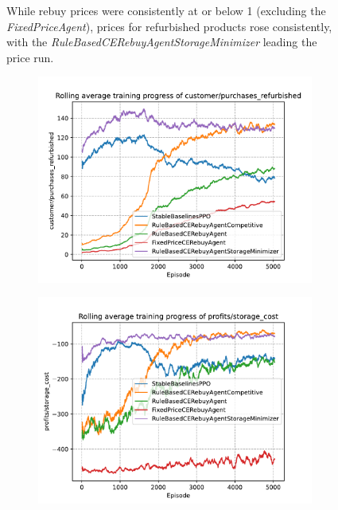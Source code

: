 \begin{figure}[ht]
\begin{subfigure}[t]{0.49\textwidth}
		\label{fig:PPOOligopolyLinePriceRefurbished}
	\end{subfigure}
	\caption{While rebuy prices were consistently at or below 1 (excluding the \emph{FixedPriceAgent}), prices for refurbished products rose consistently, with the \emph{RuleBasedCERebuyAgentStorageMinimizer} leading the price run.}\label{fig:PPOOligopolyDiagramsPrices}
\end{figure}


\begin{figure}[ht]
	\centering
	\begin{subfigure}[t]{0.49\textwidth}
		\centering
		\includegraphics[width = \textwidth]{images/experiments/PPOOligopoly/PPOOligopolyLinePurchasesRefurbished.pdf}\\
		\label{fig:PPOOligopolyLinePurchasesRefurbished}
	\end{subfigure}
	\begin{subfigure}[t]{0.49\textwidth}
		\centering
		\includegraphics[width = \textwidth]{images/experiments/PPOOligopoly/PPOOligopolyLineStorageCosts.pdf}\\

\end{subfigure}
\end{figure}
